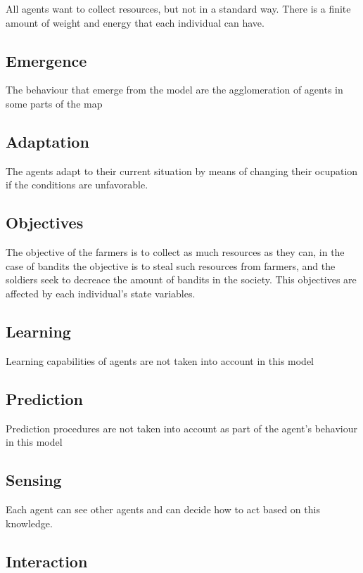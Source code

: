 \documentclass{wscpaperproc}
\theoremstyle{wsc}
\begin{document}
All agents want to collect resources, but not in a standard way. There is a
finite amount of weight and energy that each individual can have.

\subsection{Emergence}

The behaviour that emerge from the model are the agglomeration of agents in
some parts of the map

\subsection{Adaptation}

The agents adapt to their current situation by means of changing their
ocupation if the conditions are unfavorable.

\subsection{Objectives}

The objective of the farmers is to collect as much resources as they can, in
the case of bandits the objective is to steal such resources from farmers, and
the soldiers seek to decreace the amount of bandits in the society. This
objectives are affected by each individual's state variables.

\subsection{Learning}

Learning capabilities of agents are not taken into account in this model

\subsection{Prediction}

Prediction procedures are not taken into account as part of the agent's
behaviour in this model

\subsection{Sensing}

Each agent can see other agents and can decide how to act based on this
knowledge.

\subsection{Interaction}
\end{document}
